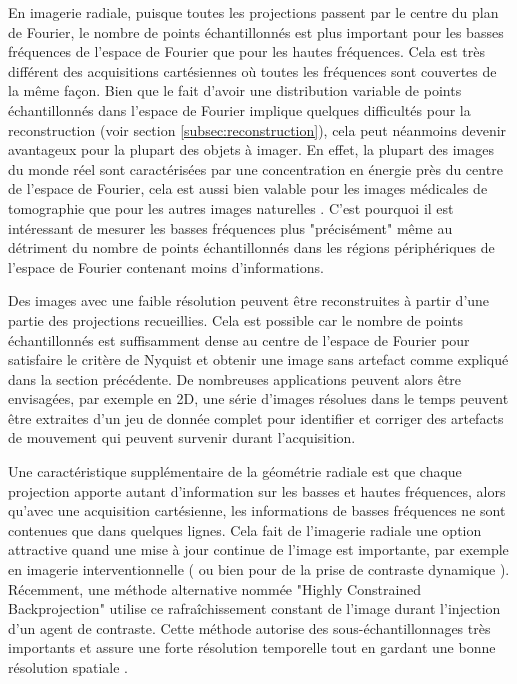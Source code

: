 En imagerie radiale, puisque toutes les projections passent par le centre du plan de Fourier, le nombre de points échantillonnés est plus important pour les basses fréquences de l'espace de Fourier que pour les hautes fréquences. Cela est très différent des acquisitions cartésiennes où toutes les fréquences sont couvertes de la même façon. Bien que le fait d'avoir une distribution variable de points échantillonnés dans l'espace de Fourier implique quelques difficultés pour la reconstruction (voir section \ref{subsec:reconstruction}), cela peut néanmoins devenir avantageux pour la plupart des objets à imager. En effet, la plupart des images du monde réel sont caractérisées par une concentration en énergie près du centre de l'espace de Fourier, cela est aussi bien valable pour les images médicales de tomographie que pour les autres images naturelles \cite{srivastava2003advances}. C'est pourquoi il est intéressant de mesurer les basses fréquences plus "précisément" même au détriment du nombre de points échantillonnés dans les régions périphériques de l'espace de Fourier contenant moins d'informations. 

Des images avec une faible résolution peuvent être reconstruites à partir d'une partie des projections recueillies. Cela est possible car le nombre de points échantillonnés est suffisamment dense au centre de l'espace de Fourier pour satisfaire le critère de Nyquist et obtenir une image sans artefact comme expliqué dans la section précédente. De nombreuses applications peuvent alors être envisagées, par exemple en 2D, une série d'images résolues dans le temps peuvent être extraites d'un jeu de donnée complet pour identifier et corriger des artefacts de mouvement qui peuvent survenir durant l'acquisition.

Une caractéristique supplémentaire de la géométrie radiale est que chaque projection apporte autant d'information sur les basses et hautes fréquences, alors qu'avec une acquisition cartésienne, les informations de basses fréquences ne sont contenues que dans quelques lignes. Cela fait de l'imagerie radiale une option attractive quand une mise à jour continue de l'image est importante, par exemple en imagerie interventionnelle (\cite{Peters:2004aa} ou bien pour de la prise de contraste dynamique \cite{Prieto:2010oq}). Récemment, une méthode alternative nommée "Highly Constrained Backprojection" utilise ce rafraîchissement constant de l'image durant l'injection d'un agent de contraste. Cette méthode autorise des sous-échantillonnages très importants et assure une forte résolution temporelle tout en gardant une bonne résolution spatiale \cite{Wu:2011vn,Grist:2012fk}.

